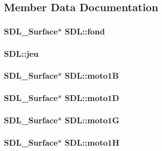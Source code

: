 \subsection{Member Data Documentation}
\hypertarget{structSDL_ac8aa1f1d7018a60c1a7440fbf0c67c3e}{
\subsubsection[{fond}]{\setlength{\rightskip}{0pt plus 5cm}S\-D\-L\-\_\-\-Surface$\ast$ S\-D\-L\-::fond}}\label{structSDL_ac8aa1f1d7018a60c1a7440fbf0c67c3e}
\hypertarget{structSDL_aed6e34a843f7e278abbc6401e7a86748}{
\subsubsection[{jeu}]{ S\-D\-L\-::jeu}}\label{structSDL_aed6e34a843f7e278abbc6401e7a86748}
\hypertarget{structSDL_afba5505e513acdd23d72af6f05fcb607}{
\subsubsection[{moto1\-B}]{\setlength{\rightskip}{0pt plus 5cm}S\-D\-L\-\_\-\-Surface$\ast$ S\-D\-L\-::moto1\-B}}\label{structSDL_afba5505e513acdd23d72af6f05fcb607}
\hypertarget{structSDL_aefe2a10ba8936a28bf524206d33b88a7}{
\subsubsection[{moto1\-D}]{\setlength{\rightskip}{0pt plus 5cm}S\-D\-L\-\_\-\-Surface$\ast$ S\-D\-L\-::moto1\-D}}\label{structSDL_aefe2a10ba8936a28bf524206d33b88a7}
\hypertarget{structSDL_af7ebeda1ebe9fcecc1b74877c3e070fa}{
\subsubsection[{moto1\-G}]{\setlength{\rightskip}{0pt plus 5cm}S\-D\-L\-\_\-\-Surface$\ast$ S\-D\-L\-::moto1\-G}}\label{structSDL_af7ebeda1ebe9fcecc1b74877c3e070fa}
\hypertarget{structSDL_ac098d302560f0f3ae1e1e850bc106e04}{
\subsubsection[{moto1\-H}]{\setlength{\rightskip}{0pt plus 5cm}S\-D\-L\-\_\-\-Surface$\ast$ S\-D\-L\-::moto1\-H}}\label{structSDL_ac098d302560f0f3ae1e1e850bc106e04}
